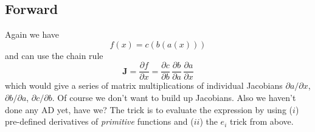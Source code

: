 \documentclass[paper=a4,11pt,headsepline]{scrartcl}
\newcommand{\ve}[1]{\ensuremath{\bm{\mathit{#1}}}}
\newcommand{\ma}[1]{\ensuremath{\bm{\mathbf{#1}}}}
\newcommand{\pd}[2]{\dfrac{\partial #1}{\partial #2}}
\newcommand{\pdi}[2]{\partial #1/\partial #2}
\begin{document}
\subsection{Forward}

Again we have
\begin{equation*}
    \ve f(\ve x) = \ve c(\ve b(\ve a(\ve x)))
\end{equation*}
and can use the chain rule
\begin{equation*}
    \ma J=\pd{\ve f}{\ve x} = \pd{\ve c}{\ve b}\,\pd{\ve b}{\ve a}\,\pd{\ve a}{\ve x}
\end{equation*}
which would give a series of matrix multiplications of individual Jacobians $\pdi{\ve
a}{\ve x}$, $\pdi{\ve b}{\ve a}$, $\pdi{\ve c}{\ve b}$. Of course we don't want
to build up Jacobians. Also we haven't done any AD yet, have we?
The trick is to evaluate the expression by using ($i$) pre-defined derivatives of
\emph{primitive} functions and ($ii$) the $\ve e_i$ trick from above.
\end{document}
